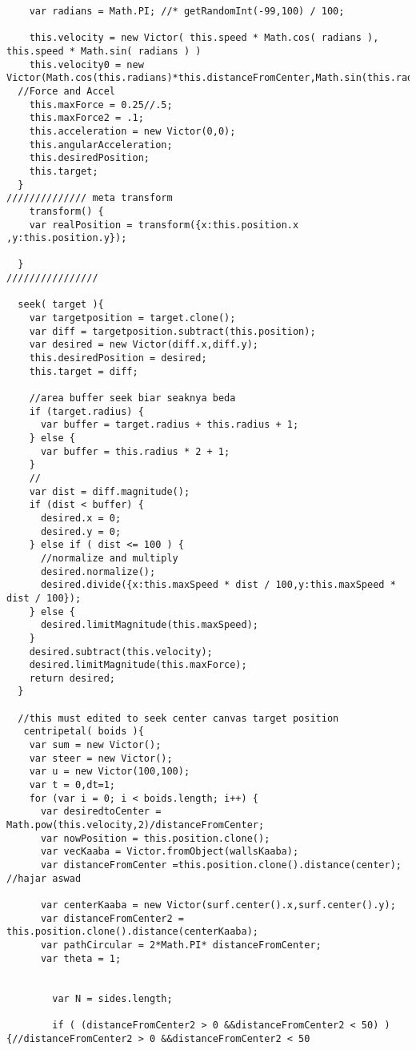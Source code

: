 \begin{lstlisting}
    var radians = Math.PI; //* getRandomInt(-99,100) / 100;
 
    this.velocity = new Victor( this.speed * Math.cos( radians ), this.speed * Math.sin( radians ) )
    this.velocity0 = new Victor(Math.cos(this.radians)*this.distanceFromCenter,Math.sin(this.radians)*this.distanceFromCenter);
  //Force and Accel
    this.maxForce = 0.25//.5;
    this.maxForce2 = .1;
    this.acceleration = new Victor(0,0);
    this.angularAcceleration;
    this.desiredPosition;
    this.target;
  }
////////////// meta transform
    transform() {
    var realPosition = transform({x:this.position.x ,y:this.position.y});

  }
////////////////

  seek( target ){
    var targetposition = target.clone();
    var diff = targetposition.subtract(this.position);
    var desired = new Victor(diff.x,diff.y);
    this.desiredPosition = desired;
    this.target = diff;

    //area buffer seek biar seaknya beda
    if (target.radius) {
      var buffer = target.radius + this.radius + 1;
    } else {
      var buffer = this.radius * 2 + 1;
    }
    //
    var dist = diff.magnitude();
    if (dist < buffer) {
      desired.x = 0;
      desired.y = 0;
    } else if ( dist <= 100 ) {
      //normalize and multiply
      desired.normalize();
      desired.divide({x:this.maxSpeed * dist / 100,y:this.maxSpeed * dist / 100});
    } else {
      desired.limitMagnitude(this.maxSpeed);
    }
    desired.subtract(this.velocity);
    desired.limitMagnitude(this.maxForce);
    return desired;
  }

  //this must edited to seek center canvas target position
   centripetal( boids ){
    var sum = new Victor();
    var steer = new Victor();
    var u = new Victor(100,100);
    var t = 0,dt=1;
    for (var i = 0; i < boids.length; i++) {
      var desiredtoCenter = Math.pow(this.velocity,2)/distanceFromCenter;
      var nowPosition = this.position.clone();
      var vecKaaba = Victor.fromObject(wallsKaaba);
      var distanceFromCenter =this.position.clone().distance(center); //hajar aswad

      var centerKaaba = new Victor(surf.center().x,surf.center().y);
      var distanceFromCenter2 = this.position.clone().distance(centerKaaba);
      var pathCircular = 2*Math.PI* distanceFromCenter;
      var theta = 1;

   
        var N = sides.length;
        
        if ( (distanceFromCenter2 > 0 &&distanceFromCenter2 < 50) ) {//distanceFromCenter2 > 0 &&distanceFromCenter2 < 50


\end{lstlisting}

